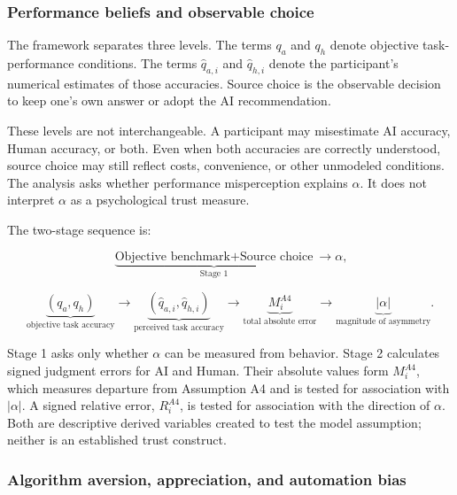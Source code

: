 \documentclass[11pt,a4paper]{article}
\begin{document}
\subsubsection{Performance beliefs and observable choice}

The framework separates three levels. The terms $q_a$ and $q_h$ denote objective task-performance conditions. The terms $\widehat q_{a,i}$ and $\widehat q_{h,i}$ denote the participant's numerical estimates of those accuracies. Source choice is the observable decision to keep one's own answer or adopt the AI recommendation.

These levels are not interchangeable. A participant may misestimate AI accuracy, Human accuracy, or both. Even when both accuracies are correctly understood, source choice may still reflect costs, convenience, or other unmodeled conditions. The analysis asks whether performance misperception explains $\alpha$. It does not interpret $\alpha$ as a psychological trust measure.

The two-stage sequence is:

\begin{equation*}
\underbrace{\text{Objective benchmark}+\text{Source choice}}_{\text{Stage 1}}
\longrightarrow \alpha,
\end{equation*}

\begin{equation*}
\underbrace{(q_a,q_h)}_{\text{objective task accuracy}}
\longrightarrow
\underbrace{(\widehat q_{a,i},\widehat q_{h,i})}_{\text{perceived task accuracy}}
\longrightarrow
\underbrace{M_i^{A4}}_{\text{total absolute error}}
\longrightarrow
\underbrace{|\alpha|}_{\text{magnitude of asymmetry}}.
\end{equation*}

Stage 1 asks only whether $\alpha$ can be measured from behavior. Stage 2 calculates signed judgment errors for AI and Human. Their absolute values form $M_i^{A4}$, which measures departure from Assumption A4 and is tested for association with $|\alpha|$. A signed relative error, $R_i^{A4}$, is tested for association with the direction of $\alpha$. Both are descriptive derived variables created to test the model assumption; neither is an established trust construct.

\subsubsection{Algorithm aversion, appreciation, and automation bias}
\end{document}
